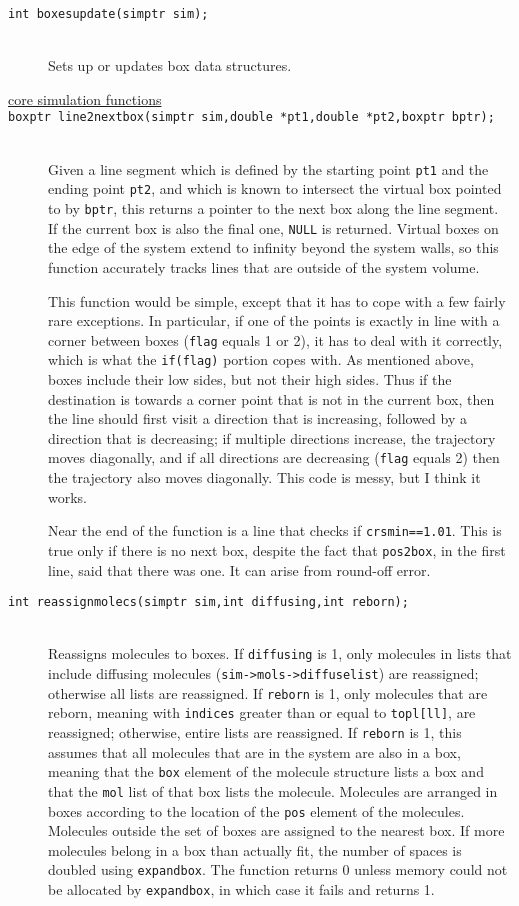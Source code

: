 \documentclass {book}
\newcommand {\ttt} {\texttt}
\begin{document}
\begin{description}
\item[\ttt{int boxesupdate(simptr sim);}]
\hfill \\
Sets up or updates box data structures.

\item[\underline{core simulation functions}]

\item[\ttt{boxptr line2nextbox(simptr sim,double *pt1,double *pt2,boxptr bptr);}]
\hfill \\
Given a line segment which is defined by the starting point \ttt{pt1} and the ending point \ttt{pt2}, and which is known to intersect the virtual box pointed to by \ttt{bptr}, this returns a pointer to the next box along the line segment. If the current box is also the final one, \ttt{NULL} is returned. Virtual boxes on the edge of the system extend to infinity beyond the system walls, so this function accurately tracks lines that are outside of the system volume.

This function would be simple, except that it has to cope with a few fairly rare exceptions. In particular, if one of the points is exactly in line with a corner between boxes (\ttt{flag} equals 1 or 2), it has to deal with it correctly, which is what the \ttt{if(flag)} portion copes with. As mentioned above, boxes include their low sides, but not their high sides. Thus if the destination is towards a corner point that is not in the current box, then the line should first visit a direction that is increasing, followed by a direction that is decreasing; if multiple directions increase, the trajectory moves diagonally, and if all directions are decreasing (\ttt{flag} equals 2) then the trajectory also moves diagonally. This code is messy, but I think it works.

Near the end of the function is a line that checks if \ttt{crsmin==1.01}. This is true only if there is no next box, despite the fact that \ttt{pos2box}, in the first line, said that there was one. It can arise from round-off error.

\item[\ttt{int reassignmolecs(simptr sim,int diffusing,int reborn);}]
\hfill \\
Reassigns molecules to boxes. If \ttt{diffusing} is 1, only molecules in lists that include diffusing molecules (\ttt{sim->mols->diffuselist}) are reassigned; otherwise all lists are reassigned. If \ttt{reborn} is 1, only molecules that are reborn, meaning with \ttt{indices} greater than or equal to \ttt{topl[ll]}, are reassigned; otherwise, entire lists are reassigned. If \ttt{reborn} is 1, this assumes that all molecules that are in the system are also in a box, meaning that the \ttt{box} element of the molecule structure lists a box and that the \ttt{mol} list of that box lists the molecule. Molecules are arranged in boxes according to the location of the \ttt{pos} element of the molecules. Molecules outside the set of boxes are assigned to the nearest box. If more molecules belong in a box than actually fit, the number of spaces is doubled using \ttt{expandbox}. The function returns 0 unless memory could not be allocated by \ttt{expandbox}, in which case it fails and returns 1.


\end{description}
\end{document}
